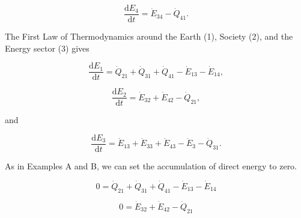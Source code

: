 \begin{equation} \label{eq:C-CV_E_dot_4_simp}
	\frac{\mathrm{d}E_{4}}{\mathrm{d}t} 	 =  \dot{E}_{34} - \dot{Q}_{41}.
\end{equation}





The First Law of Thermodynamics around the Earth (1), Society (2), and the Energy sector (3) gives

\begin{equation} \label{eq:C-CV_E_dot_1}
	\frac{\mathrm{d}E_{1}}{\mathrm{d}t} 	 =  \dot{Q}_{21} + \dot{Q}_{31} + \dot{Q}_{41} - \dot{E}_{13} - \dot{E}_{14},
\end{equation}

\begin{equation} \label{eq:C-CV_E_dot_2}
	\frac{\mathrm{d}E_{2}}{\mathrm{d}t} 	 = \dot{E}_{32}  + \dot{E}_{42} - \dot{Q}_{21},
\end{equation}

\noindent and 

\begin{equation} \label{eq:C-CV_E_dot_3}
	\frac{\mathrm{d}E_{3}}{\mathrm{d}t} 	 = \dot{E}_{13} + \dot{E}_{33} + \dot{E}_{43} - \dot{E}_{3} - \dot{Q}_{31}.
\end{equation}

As in Examples A and B, we can set the accumulation of direct energy to zero.

\begin{equation} \label{eq:C-CV_E_dot_1_SS}
	0 =  \dot{Q}_{21} + \dot{Q}_{31} + \dot{Q}_{41} - \dot{E}_{13} - \dot{E}_{14}
\end{equation}

\begin{equation} \label{eq:C-CV_E_dot_2_SS}
	0  = \dot{E}_{32}  + \dot{E}_{42} - \dot{Q}_{21}
\end{equation}

